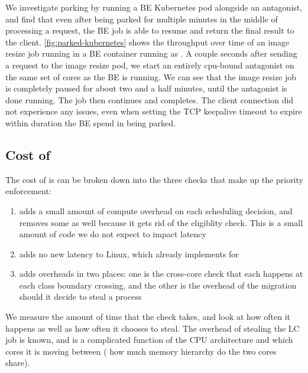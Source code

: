 We investigate parking by running a BE Kubernetes pod alongside an antagonist,
and find that even after being parked for multiple minutes in the middle of
processing a request, the BE job is able to resume and return the final result
to the client. \autoref{fig:parked-kubernetes} shows the throughput over time of
an image resize job running in a BE container running as \schedbe{}. A couple
seconds after sending a request to the image resize pod, we start an entirely
cpu-bound antagonist on the same set of cores as the BE is running. We can see
that the image resize job is completely paused for about two and a half minutes,
until the antagonist is done running. The job then continues and completes. The
client connection did not experience any issues, even when setting the TCP
keepalive timeout to expire within duration the BE spend in being parked.



\subsection{Cost of \schedbe{}}

The cost of \schedbe{} is can be broken down into the three checks that make up
the priority enforcement:

\begin{enumerate}
    \item \local{} adds a small amount of compute overhead on each scheduling
    decision, and removes some as well because it gets rid of the eligiblity
    check. This is a small amount of code we do not expect to impact latency
    \item \entry{} adds no new latency to Linux, which already implements
    \entry{} for \schedidle{}
    \item \exit{} adds overheads in two places: one is the cross-core check that
    each happens at each class boundary crossing, and the other is the overhead
    of the migration should it decide to steal a \schednormal{} process
\end{enumerate}

We measure the amount of time that the \exit{} check takes, and look at how
often it happens as well as how often it chooses to steal. The overhead of
stealing the LC job is known, and is a complicated function of the CPU
architecture and which cores it is moving between (\eg{} how much memory
hierarchy do the two cores share).



